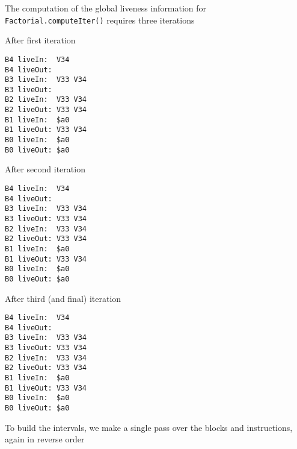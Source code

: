\documentclass[8pt,a4paper,compress]{beamer}
\begin{document}
\begin{frame}[fragile]
\pause

The computation of the global liveness information for \lstinline{Factorial.computeIter()} requires three iterations

\pause
\bigskip

After first iteration
\begin{lstlisting}[language={}]
B4 liveIn:  V34
B4 liveOut:
B3 liveIn:  V33 V34
B3 liveOut:
B2 liveIn:  V33 V34
B2 liveOut: V33 V34
B1 liveIn:  $a0                                                                 
B1 liveOut: V33 V34                                                             
B0 liveIn:  $a0
B0 liveOut: $a0
\end{lstlisting}

\pause

After second iteration
\begin{lstlisting}[language={}]
B4 liveIn:  V34
B4 liveOut:
B3 liveIn:  V33 V34
B3 liveOut: V33 V34
B2 liveIn:  V33 V34
B2 liveOut: V33 V34
B1 liveIn:  $a0                                                                 
B1 liveOut: V33 V34                                                             
B0 liveIn:  $a0
B0 liveOut: $a0
\end{lstlisting}
\end{frame}

\begin{frame}[fragile]
\pause

After third (and final) iteration
\begin{lstlisting}[language={}]
B4 liveIn:  V34
B4 liveOut:
B3 liveIn:  V33 V34
B3 liveOut: V33 V34
B2 liveIn:  V33 V34
B2 liveOut: V33 V34
B1 liveIn:  $a0
B1 liveOut: V33 V34
B0 liveIn:  $a0                                                                 
B0 liveOut: $a0
\end{lstlisting}

\pause
\bigskip

To build the intervals, we make a single pass over the blocks and instructions, again in reverse order
\end{frame}
\end{document}
